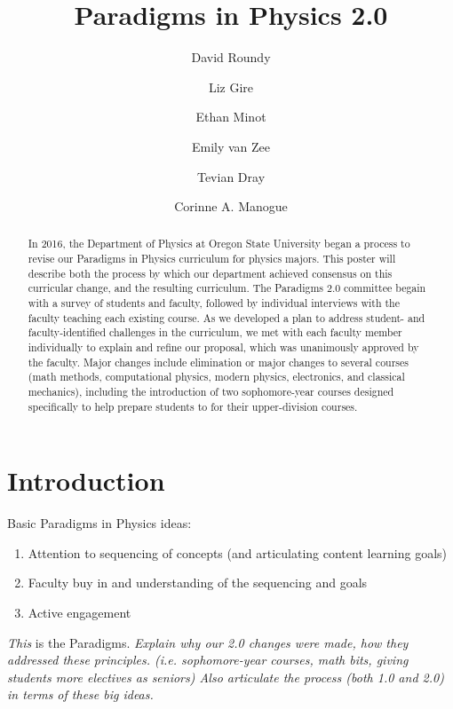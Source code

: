 \documentclass[english,aps,pra,reprint,noshowpacs,superscriptaddress]{revtex4-1}
\begin{document}
\title{Paradigms in Physics 2.0}
\author{David Roundy}
\author{Liz Gire}
\author{Ethan Minot}
\author{Emily van Zee}
\author{Tevian Dray}
\author{Corinne A. Manogue}


\begin{abstract}
In 2016, the Department of Physics at Oregon State University began a
process to revise our Paradigms in Physics curriculum for physics
majors.  This poster will describe both the process by which our
department achieved consensus on this curricular change, and the
resulting curriculum.  The Paradigms 2.0 committee begain with a
survey of students and faculty, followed by individual interviews with
the faculty teaching each existing course.  As we developed a plan to
address student- and faculty-identified challenges in the curriculum,
we met with each faculty member individually to explain and refine our
proposal, which was unanimously approved by the faculty.  Major
changes include elimination or major changes to several courses (math
methods, computational physics, modern physics, electronics, and
classical mechanics), including the introduction of two sophomore-year
courses designed specifically to help prepare students to for their
upper-division courses.
\end{abstract}

\maketitle

\section{Introduction}
Basic Paradigms in Physics ideas:
\begin{enumerate}
\item Attention to sequencing of concepts (and articulating content
  learning goals)
\item Faculty buy in and understanding of the sequencing and goals
\item Active engagement
\end{enumerate}
\emph{This} is the Paradigms.  \emph{Explain why our 2.0 changes were
  made, how they addressed these principles.  (i.e. sophomore-year
  courses, math bits, giving students more electives as seniors) Also
  articulate the process (both 1.0 and 2.0) in terms of these big
  ideas.}
\end{document}
